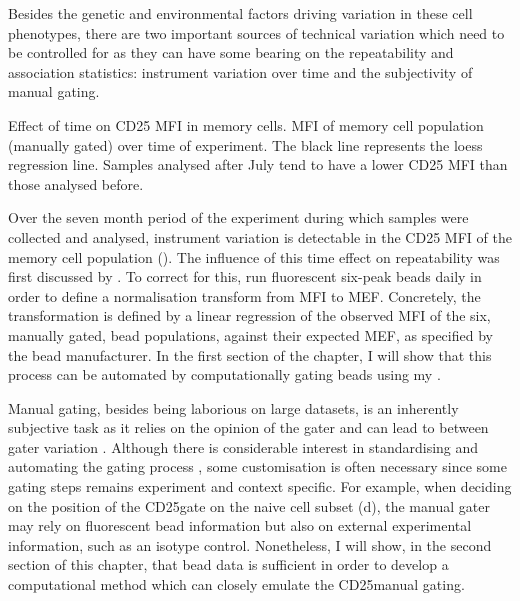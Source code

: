 Besides the genetic and environmental factors driving variation in these cell phenotypes, there are two important sources of technical variation which 
need to be controlled for as they can have some bearing on the repeatability and association statistics:
instrument variation over time and the subjectivity of manual gating.

{Effect of time on CD25 MFI in memory cells.}
{
 MFI of memory cell population (manually gated) over time of experiment.
The black line represents the loess regression line.
Samples analysed after July tend to have a lower CD25 MFI than those analysed before.
}

Over the seven month period of the experiment during which samples were collected and analysed,
instrument variation is detectable in the CD25 \gls{MFI} of the memory cell population ().
The influence of this time effect on repeatability was first discussed by \citet{Dendrou:2009bl}.  
To correct for this, \citet{Dendrou:2009dv} run fluorescent six-peak beads daily in order to define a normalisation transform from \gls{MFI} to \gls{MEF}.
Concretely, the transformation is defined by a linear regression
of the observed \gls{MFI} of the six, manually gated, bead populations, against their
expected \gls{MEF}, as specified by the bead manufacturer.
In the first section of the chapter, I will show that this process can be automated by computationally gating beads using my .

Manual gating, besides being laborious on large datasets, is an inherently subjective task as it relies on the opinion of the gater and can lead to
between gater variation \citep{Maecker:2005gm}.
Although there is considerable interest in standardising and automating the gating process \citep{Aghaeepour:2013dg},
some customisation is often necessary since some gating steps remains experiment and context specific.  
For example, when deciding on the position of the CD25\positive gate on the naive cell subset (d), the manual gater 
may rely on fluorescent bead information but also on external experimental information, such as an isotype control.
Nonetheless, I will show, in the second section of this chapter,
that bead data is sufficient in order to develop a computational method which can closely emulate the CD25\positive manual gating.

